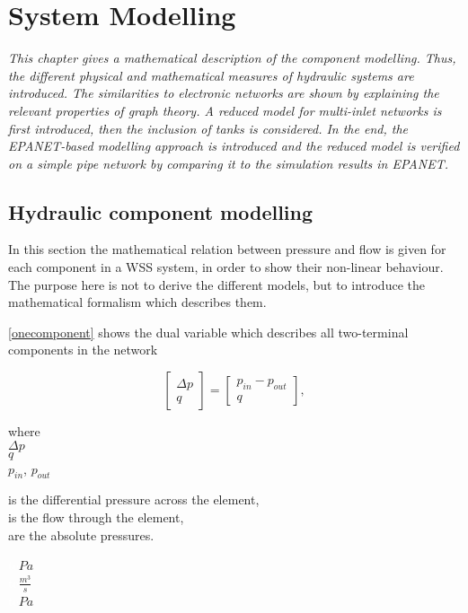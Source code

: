 \chapter{System Modelling}
\label{system_modelling}

\emph{This chapter gives a mathematical description of the component modelling. Thus, the different physical and mathematical measures of hydraulic systems are introduced. The similarities to electronic networks are shown by explaining the relevant properties of graph theory. A reduced model for multi-inlet networks is first introduced, then the inclusion of tanks is considered. In the end, the EPANET-based modelling approach is introduced and the reduced model is verified on a simple pipe network by comparing it to the simulation results in EPANET.}

\section{Hydraulic component modelling}
\label{hydraulic_component_modelling}

In this section the mathematical relation between pressure and flow is given for each component in a WSS system, in order to show their non-linear behaviour. The purpose here is not to derive the different models, but to introduce the mathematical formalism which describes them.

\eqref{onecomponent} shows the dual variable which describes all two-terminal components in the network 

\begin{equation}
\label{onecomponent}
 \begin{bmatrix}
    \Delta p \\
    q
\end{bmatrix}
=
 \begin{bmatrix}
    p_{in} - p_{out} \\
    q
\end{bmatrix},
\end{equation}

 \begin{minipage}[t]{0.20\textwidth}
where\\
\hspace*{8mm} $\Delta p$ \\
\hspace*{8mm} $q$ \\
\hspace*{8mm} $p_{in}$, $p_{out}$ 
\end{minipage}
\begin{minipage}[t]{0.68\textwidth}
\vspace*{2mm}
is the differential pressure across the element,\\
is the flow through the element,\\
are the absolute pressures.
\end{minipage}
\begin{minipage}[t]{0.10\textwidth}
\vspace*{2mm}
\textcolor{White}{te}$\unit{Pa}$\\
\textcolor{White}{te}$\unit{\frac{m^3}{s}}$\\
\textcolor{White}{te}$\unit{Pa}$
\end{minipage}

